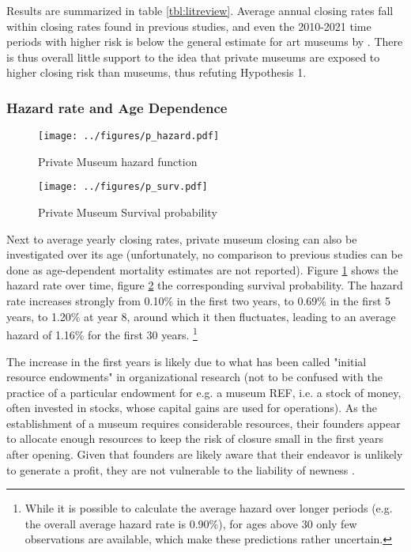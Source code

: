 \documentclass[12pt]{article}
\begin{document}
Results are summarized in table \ref{tbl:litreview}.
Average annual closing rates fall within closing rates found in previous studies, and even the 2010-2021 time periods with higher risk is below the general estimate for art museums by \textcite{Hager_2001_vulnerability}.
There is thus overall little support to the idea that private museums are exposed to higher closing risk than museums, thus refuting Hypothesis 1.
\subsubsection*{Hazard rate and Age Dependence}


\begin{figure}[htbp]
\centering
\texttt{[image: ../figures/p\_hazard.pdf]}
\caption{\label{fig:p_hazard}Private Museum hazard function}
\end{figure}

\begin{figure}[htbp]
\centering
\texttt{[image: ../figures/p\_surv.pdf]}
\caption{\label{fig:p_surv}Private Museum Survival probability}
\end{figure}


Next to average yearly closing rates, private museum closing can also be investigated over its age (unfortunately, no comparison to previous studies can be done as age-dependent mortality estimates are not reported).
Figure \ref{fig:p_hazard} shows the hazard rate over time, figure \ref{fig:p_surv} the corresponding survival probability.
The hazard rate increases strongly from 0.10\% in the first two years, to 0.69\% in the first 5 years, to 1.20\% at year 8, around which it then fluctuates, leading to an average hazard of 1.16\% for the first 30 years. \footnote{While it is possible to calculate the average hazard over longer periods (e.g. the overall average hazard rate is 0.90\%), for ages above 30 only few observations are available, which make these predictions rather uncertain.}


The increase in the first years is likely due to what has been called "initial resource endowments" in organizational research \cite{Carroll_Khessina_2019_demography,Hannan_1998_mortality} (not to be confused with the practice of a particular endowment for e.g. a museum REF, i.e. a stock of money, often invested in stocks, whose capital gains are used for operations).
As the establishment of a museum requires considerable resources, their founders appear to allocate enough resources to keep the risk of closure small in the first years after opening.
Given that founders are likely aware that their endeavor is unlikely to generate a profit, they are not vulnerable to the liability of newness \parencite{Stinchcombe_1965_structure}.
\end{document}
